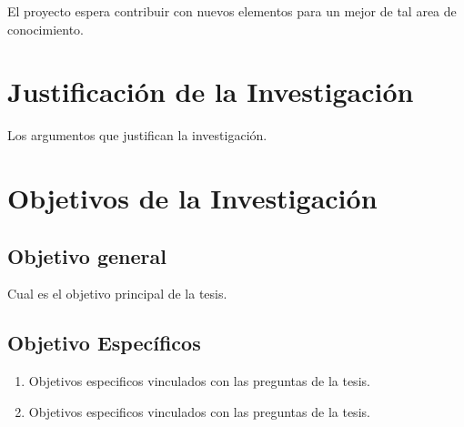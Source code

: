 El proyecto espera contribuir con nuevos elementos para un mejor de tal area de conocimiento.

\section{Justificación de la Investigación}

Los argumentos que justifican la investigación. 


\section{Objetivos de la Investigación}


\subsection{Objetivo general}

Cual es el objetivo principal de la tesis.

\subsection{Objetivo Específicos}

\begin{enumerate}
	\item Objetivos especificos vinculados con las preguntas de la tesis.
	\item Objetivos especificos vinculados con las preguntas de la tesis.
\end{enumerate}


